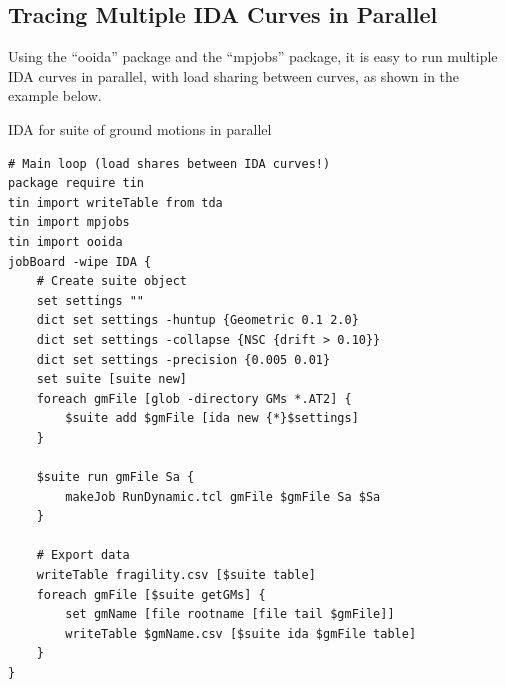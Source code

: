\documentclass{article}
\renewcommand{\^}[1]{\textsuperscript{#1}}
\renewcommand{\_}[1]{\textsubscript{#1}}
\begin{document}
\subsection{Tracing Multiple IDA Curves in Parallel}
Using the ``ooida'' package and the ``mpjobs'' package, it is easy to run multiple IDA curves in parallel, with load sharing between curves, as shown in the example below. 

\begin{example}{IDA for suite of ground motions in parallel}
\begin{lstlisting}
# Main loop (load shares between IDA curves!)
package require tin
tin import writeTable from tda
tin import mpjobs
tin import ooida
jobBoard -wipe IDA {
    # Create suite object
    set settings ""
    dict set settings -huntup {Geometric 0.1 2.0}
    dict set settings -collapse {NSC {drift > 0.10}}
    dict set settings -precision {0.005 0.01}
    set suite [suite new]
    foreach gmFile [glob -directory GMs *.AT2] {
        $suite add $gmFile [ida new {*}$settings]
    }

    $suite run gmFile Sa {
        makeJob RunDynamic.tcl gmFile $gmFile Sa $Sa
    }

    # Export data
    writeTable fragility.csv [$suite table]
    foreach gmFile [$suite getGMs] {
        set gmName [file rootname [file tail $gmFile]]
        writeTable $gmName.csv [$suite ida $gmFile table]
    }
}
\end{lstlisting}
\end{example}


\printindex
\end{document}
